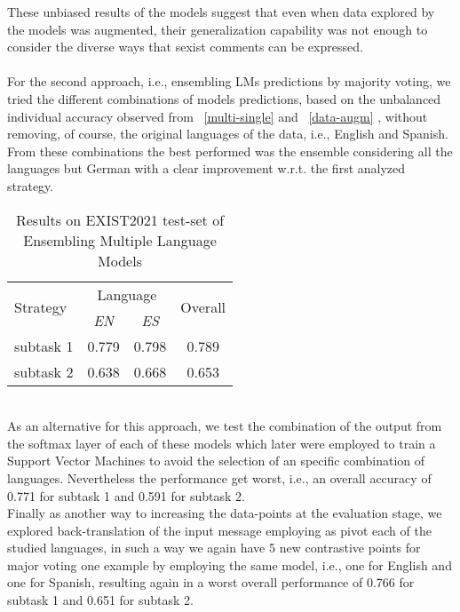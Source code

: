 \documentclass[
]{ceurart}
\begin{document}
	These unbiased results of the models suggest that even when data explored by the models was augmented, their generalization capability was not enough to consider the diverse ways that sexist comments can be expressed.\\\\
	For the second approach, i.e., ensembling LMs predictions by majority voting,  we tried the different combinations of models predictions, based on the unbalanced individual accuracy observed from \tablename~\ref{multi-single} and \tablename~\ref{data-augm} , without removing, of course, the original languages of the data, i.e., English and Spanish. From these combinations the best performed was the ensemble considering all the languages but German with a clear improvement w.r.t. the first analyzed strategy.
	\begin{table}[thb!]
		\begin{center} 		
			\caption{Results on EXIST2021 test-set of Ensembling Multiple Language Models}	
			\begin{tabular}{lccc} 
				\hline	\multirow{2}{*}{Strategy}&\multicolumn{2}{c}{Language}&\multirow{2}{*}{Overall}\\
				\cline{2-3}
				&\textit{EN}&\textit{ES}&\\
				\hline
				subtask 1 & 0.779& 0.798& 0.789\\
				subtask 2& 0.638& 0.668& 0.653\\
				\hline
			\end{tabular}
			\label{ensemble}
		\end{center}
	\end{table}		 	
	\\
	As an alternative for this approach, we test the combination of the output from the softmax layer of each of these models which later were employed to train a Support Vector Machines to avoid the selection of an specific combination of languages. Nevertheless the performance get worst, i.e., an overall accuracy of  0.771 for subtask 1 and 0.591 for subtask 2. 
	\\
	Finally as another way to increasing the data-points at the evaluation stage, we explored back-translation of the input message employing as pivot each of the studied  languages, in such a way we again have 5 new contrastive points for major voting one example by employing the same model, i.e., one for English and one for Spanish, resulting again in a worst overall performance of 0.766 for subtask 1 and 0.651 for subtask 2.
	\\\\
\end{document}
